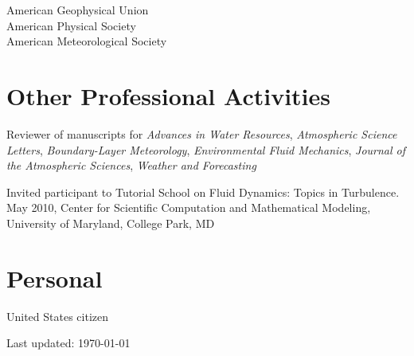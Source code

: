 \documentclass[11pt,letterpaper]{article}
\begin{document}
American Geophysical Union \\
American Physical Society \\
American Meteorological Society 


\section*{Other Professional Activities} 
Reviewer of manuscripts for \textit{Advances in Water Resources}, \textit{Atmospheric Science Letters}, \textit{Boundary-Layer Meteorology}, \textit{Environmental Fluid Mechanics}, \textit{Journal of the Atmospheric Sciences}, \textit{Weather and Forecasting} 

Invited participant to Tutorial School on Fluid Dynamics: Topics in Turbulence. May 2010, Center for Scientific Computation and Mathematical Modeling, University of Maryland, College Park, MD 

\section*{Personal} 
United States citizen

\bigskip
{\small Last updated: \today}
\end{document}
